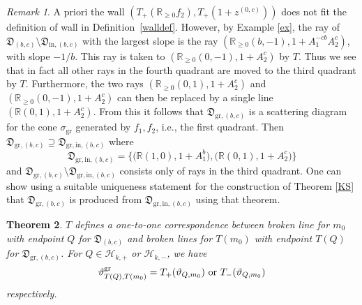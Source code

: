 \documentclass[12pt]{amsart}
\newtheorem{theorem}{Theorem}[section]
\theoremstyle{remark}
\newtheorem{remark}[theorem]{Remark}
\newcommand{\RR}{\mathbb{R}}
\newcommand{\DD}{\mathfrak{D}}
\newcommand{\gr}{\mathrm{gr}}
\begin{document}
\begin{remark}
A priori the wall $(T_+(\RR_{\ge 0}f_2),T_+(1+z^{(0,c)}))$ does not
fit the definition of wall in Definition~\ref{walldef}. However, 
by Example \ref{ex}, the ray of $\DD_{(b,c)}\setminus
\DD_{\mathrm{in},(b,c)}$ with the largest slope is the ray
$(\RR_{\ge 0} (b,-1),1+A_1^{-cb}A_2^c)$, with slope $-1/b$. This ray 
is taken to  $(\RR_{\ge 0}(0,-1),1+A_2^c)$ by $T$. 
Thus we see that in fact all other rays in the 
fourth quadrant are moved to the third quadrant by $T$. 
Furthermore, the two
rays $(\RR_{\ge 0} (0,1), 1+A_2^c)$ and $(\RR_{\ge 0}(0,-1), 1+A_2^c)$
can then be replaced by a single line $(\RR (0,1), 1+A_2^c)$. 
From this it follows that
$\DD_{\gr,(b,c)}$ is a scattering diagram for the cone $\sigma_{\gr}$
generated by $f_1, f_2$, i.e., the first quadrant. 
Then $\DD_{\gr,(b,c)}\supseteq\DD_{\gr,\mathrm{in},(b,c)}$ where
\[
\DD_{\gr,\mathrm{in},(b,c)}=\big\{\big(\RR(1,0), 1+A_1^b\big), 
\big(\RR (0,1), 1+A_2^c\big)\big\}
\]
and 
$\DD_{\gr,(b,c)}\setminus\DD_{\gr,\mathrm{in},(b,c)}$ consists only of rays
in the third quadrant. One can show using a suitable uniqueness statement
for the construction of Theorem \ref{KS} that $\DD_{\gr,(b,c)}$
is produced from $\DD_{\gr,\mathrm{in},(b,c)}$ using that theorem.
\end{remark}

\begin{theorem}
$T$ defines a one-to-one correspondence between broken line for $m_0$ with endpoint $Q$ for $\DD_{(b,c)}$ and broken lines for $T(m_0)$ with endpoint $T(Q)$ for $\DD_{\gr,(b,c)}$. For $Q \in \mathcal{H}_{k,+}$ or $\mathcal{H}_{k,-}$, we have
\[ 
\hbox{$\vartheta^{\gr}_{T(Q),T( m_0)} = T_{+} (\vartheta_{Q, m_0})$
or $T_{-} (\vartheta_{Q, m_0})$}\]
respectively.
\end{theorem}
\end{document}
